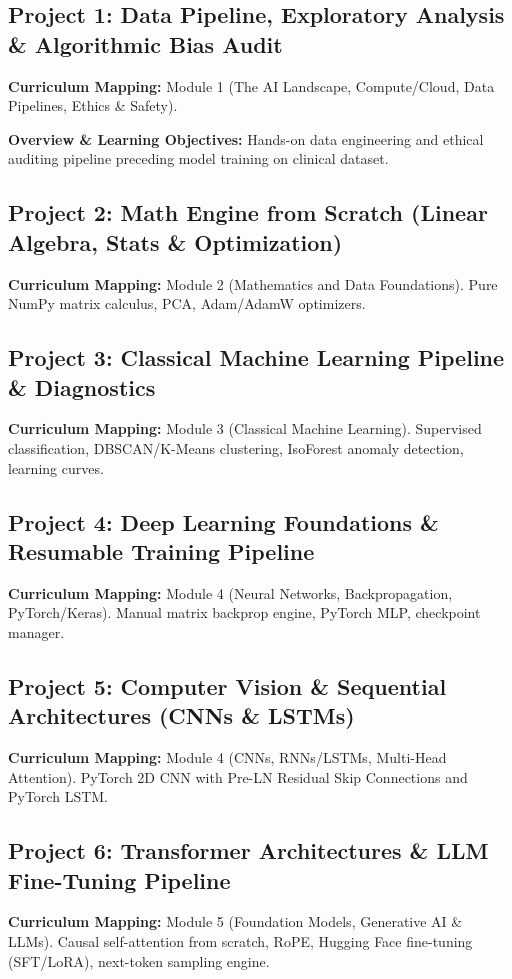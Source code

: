 \documentclass[11pt,a4paper]{article}
\begin{document}
	\subsection*{Project 1: Data Pipeline, Exploratory Analysis \& Algorithmic Bias Audit}
	\textbf{Curriculum Mapping:} Module 1 (The AI Landscape, Compute/Cloud, Data Pipelines, Ethics \& Safety).

	\textbf{Overview \& Learning Objectives:} Hands-on data engineering and ethical auditing pipeline preceding model training on clinical dataset.

	\subsection*{Project 2: Math Engine from Scratch (Linear Algebra, Stats \& Optimization)}
	\textbf{Curriculum Mapping:} Module 2 (Mathematics and Data Foundations). Pure NumPy matrix calculus, PCA, Adam/AdamW optimizers.

	\subsection*{Project 3: Classical Machine Learning Pipeline \& Diagnostics}
	\textbf{Curriculum Mapping:} Module 3 (Classical Machine Learning). Supervised classification, DBSCAN/K-Means clustering, IsoForest anomaly detection, learning curves.

	\subsection*{Project 4: Deep Learning Foundations \& Resumable Training Pipeline}
	\textbf{Curriculum Mapping:} Module 4 (Neural Networks, Backpropagation, PyTorch/Keras). Manual matrix backprop engine, PyTorch MLP, checkpoint manager.

	\subsection*{Project 5: Computer Vision \& Sequential Architectures (CNNs \& LSTMs)}
	\textbf{Curriculum Mapping:} Module 4 (CNNs, RNNs/LSTMs, Multi-Head Attention). PyTorch 2D CNN with Pre-LN Residual Skip Connections and PyTorch LSTM.

	\subsection*{Project 6: Transformer Architectures \& LLM Fine-Tuning Pipeline}
	\textbf{Curriculum Mapping:} Module 5 (Foundation Models, Generative AI \& LLMs). Causal self-attention from scratch, RoPE, Hugging Face fine-tuning (SFT/LoRA), next-token sampling engine.
\end{document}
